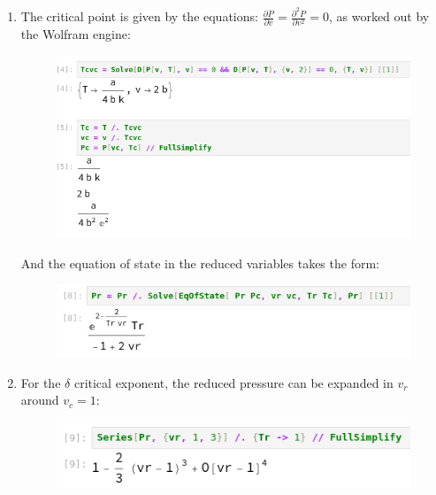 \documentclass[12pt,a4]{article}
\begin{document}
\begin{enumerate}
    \begin{enumerate}
      \item
        The critical point is given by the equations: $\frac{\partial P}{\partial v} = \frac{\partial^2 P}{\partial v^2} = 0$, as worked out by the Wolfram engine:
        \begin{figure}[H]
          \begin{center}
            \includegraphics[scale = 0.8]{criticalPoint.png}
          \end{center}
        \end{figure}
        And the equation of state in the reduced variables takes the form:
        \begin{figure}[H]
          \begin{center}
            \includegraphics[scale = 0.8]{eqStateRedVar.png}
          \end{center}
        \end{figure}
      \item
        For the $\delta$ critical exponent, the reduced pressure can be expanded in $v_r$ around $v_c = 1$:
        \begin{figure}[H]
          \begin{center}
            \includegraphics[scale = 0.8]{delta.png}
          \end{center}

\end{figure}
\end{enumerate}
\end{enumerate}
\end{document}
